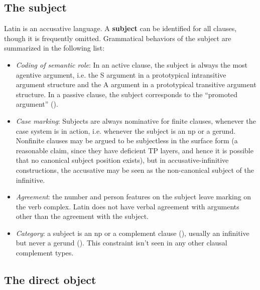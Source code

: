 \documentclass[a4paper, oneside]{report}
\newcommand*{\concept}[1]{\textbf{#1}}
\begin{document}
\subsection{The subject}

Latin is an accusative language.
A \concept{subject} can be identified for all clauses, 
though it is frequently omitted.
Grammatical behaviors of the subject are summarized in the following list: 
\begin{itemize}
    \item \emph{Coding of semantic role}: In an active clause, 
    the subject is always the most agentive argument,
    i.e. the S argument in a prototypical intransitive argument structure 
    and the A argument in a prototypical transitive argument structure.
    In a passive clause, 
    the subject corresponds to the ``promoted argument'' ().  
    \item \emph{Case marking}: 
    Subjects are always nominative for finite clauses,
    whenever the case system is in action,
    i.e. whenever the subject is an \ac{np} or a gerund. 
    Nonfinite clauses may be argued to be subjectless in the surface form 
    (a reasonable claim, since they have deficient TP layers, 
    and hence it is possible that no canonical subject position exists),
    but in accusative-infinitive constructions, %
    the accusative may be seen as the non-canonical subject of the infinitive.
    \item \emph{Agreement}: 
    the number and person features on the subject leave marking on the verb complex.
    Latin does not have verbal agreement with arguments other than the agreement with the subject.
    \item \emph{Category}: a subject is an \ac{np}  
    or a complement clause (), 
    usually an infinitive but never a gerund ().
    This constraint isn't seen in any other clausal complement types.
\end{itemize}


\subsection{The direct object}
\end{document}
